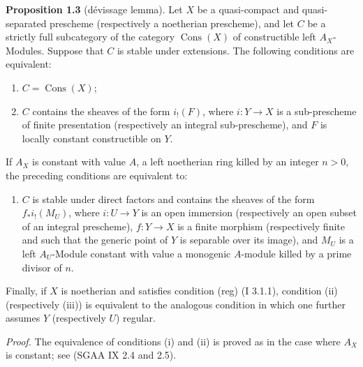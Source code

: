 \documentclass[11pt]{article}
\providecommand{\Cons}{\operatorname{Cons}}
\begin{document}
\textbf{Proposition 1.3} (dévissage lemma). Let $X$ be a quasi-compact and quasi-separated prescheme (respectively a noetherian prescheme), and let $C$ be a strictly full subcategory of the category $\Cons(X)$ of constructible left $A_X$-Modules. Suppose that $C$ is stable under extensions. The following conditions are equivalent:
\begin{enumerate}[label=(\roman*)]
\item $C=\Cons(X)$;
\item $C$ contains the sheaves of the form $i_!(F)$, where $i:Y\to X$ is a sub-prescheme of finite presentation (respectively an integral sub-prescheme), and $F$ is locally constant constructible on $Y$.
\end{enumerate}
If $A_X$ is constant with value $A$, a left noetherian ring killed by an integer $n>0$, the preceding conditions are equivalent to:
\begin{enumerate}[label=(\roman*),start=3]
\item $C$ is stable under direct factors and contains the sheaves of the form $f_*i_!(M_U)$, where $i:U\to Y$ is an open immersion (respectively an open subset of an integral prescheme), $f:Y\to X$ is a finite morphism (respectively finite and such that the generic point of $Y$ is separable over its image), and $M_U$ is a left $A_U$-Module constant with value a monogenic $A$-module killed by a prime divisor of $n$.
\end{enumerate}
Finally, if $X$ is noetherian and satisfies condition (reg) (I 3.1.1), condition (ii) (respectively (iii)) is equivalent to the analogous condition in which one further assumes $Y$ (respectively $U$) regular.

\emph{Proof.} The equivalence of conditions (i) and (ii) is proved as in the case where $A_X$ is constant; see (SGAA IX 2.4 and 2.5).
\end{document}
